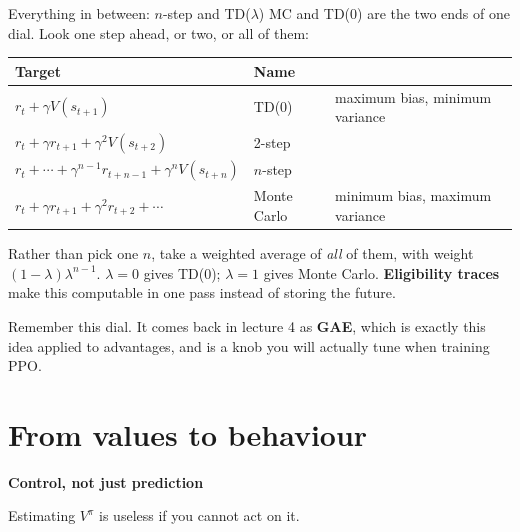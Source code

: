 \documentclass[aspectratio=169]{beamer}
\begin{document}
\begin{frame}{Everything in between: $n$-step and TD($\lambda$)}
  \small
  MC and TD(0) are the two ends of one dial. Look one step ahead, or two, or all of them:

  \vskip 6pt
  \begin{center}
  \footnotesize
  \begin{tabular}{l l l}
    \toprule
    \textbf{Target} & \textbf{Name} & \\
    \midrule
    $r_t + \gamma V(s_{t+1})$ & TD(0) & maximum bias, minimum variance \\
    $r_t + \gamma r_{t+1} + \gamma^2 V(s_{t+2})$ & 2-step & \\
    $r_t + \cdots + \gamma^{n-1} r_{t+n-1} + \gamma^n V(s_{t+n})$ & $n$-step & \\
    $r_t + \gamma r_{t+1} + \gamma^2 r_{t+2} + \cdots$ & Monte Carlo & minimum bias, maximum variance \\
    \bottomrule
  \end{tabular}
  \end{center}

  \vskip 8pt
  \begin{tcolorbox}[colback=paramgreen!8, colframe=paramgreen, boxrule=0.6pt, arc=2pt,
                    title={\textbf{TD($\lambda$)}}]
    \small
    Rather than pick one $n$, take a weighted average of \emph{all} of them, with weight
    $(1-\lambda)\lambda^{n-1}$. $\lambda = 0$ gives TD(0); $\lambda = 1$ gives Monte Carlo.
    \textbf{Eligibility traces} make this computable in one pass instead of storing the future.
  \end{tcolorbox}

  \vskip 6pt
  \begin{center}
    \small
    Remember this dial. It comes back in lecture 4 as \textbf{GAE}, which is exactly this idea
    applied to advantages, and is a knob you will actually tune when training PPO.
  \end{center}
\end{frame}

\section{From values to behaviour}
\begin{frame}[plain]
  \begin{center}
    \vskip 1.6cm
    {\Huge\bfseries\color{popblue}Control, not just prediction}

    \vskip 0.6cm
    {\large Estimating $V^\pi$ is useless if you cannot act on it.}
  \end{center}
\end{frame}
\end{document}
